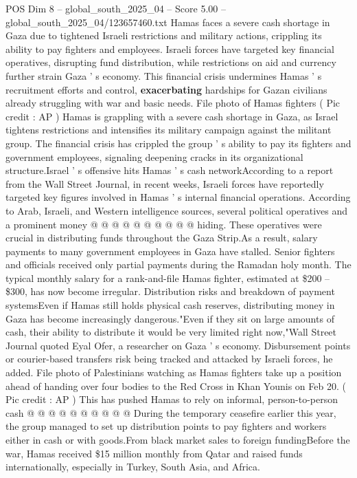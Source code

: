 \begin{textsample}{POS Dim 8 – global\_south\_2025\_04 – Score 5.00 – global\_south\_2025\_04/123657460.txt}  \label{ex:f8_pos_163}
Hamas faces a severe cash shortage in Gaza due to tightened Israeli restrictions and military actions, crippling its ability to pay fighters and employees.
Israeli forces have targeted key financial operatives, disrupting fund distribution, while restrictions on aid and currency further strain Gaza ' s economy.
This financial crisis undermines Hamas ' s recruitment efforts and control, \textbf{exacerbating} hardships for Gazan civilians already struggling with war and basic needs.
File photo of Hamas fighters ( Pic credit : AP ) Hamas is grappling with a severe cash shortage in Gaza, as Israel tightens restrictions and intensifies its military campaign against the militant group.
The financial crisis has crippled the group ' s ability to pay its fighters and government employees, signaling deepening cracks in its organizational structure.Israel ' s offensive hits Hamas ' s cash networkAccording to a report from the Wall Street Journal, in recent weeks, Israeli forces have reportedly targeted key figures involved in Hamas ' s internal financial operations.
According to Arab, Israeli, and Western intelligence sources, several political operatives and a prominent money @ @ @ @ @ @ @ @ @ @ hiding.
These operatives were crucial in distributing funds throughout the Gaza Strip.As a result, salary payments to many government employees in Gaza have stalled.
Senior fighters and officials received only partial payments during the Ramadan holy month.
The typical monthly salary for a rank-and-file Hamas fighter, estimated at \$200 -- \$300, has now become irregular.
Distribution risks and breakdown of payment systemsEven if Hamas still holds physical cash reserves, distributing money in Gaza has become increasingly dangerous."Even if they sit on large amounts of cash, their ability to distribute it would be very limited right now,"Wall Street Journal quoted Eyal Ofer, a researcher on Gaza ' s economy.
Disbursement points or courier-based transfers risk being tracked and attacked by Israeli forces, he added.
File photo of Palestinians watching as Hamas fighters take up a position ahead of handing over four bodies to the Red Cross in Khan Younis on Feb 20. ( Pic credit : AP ) This has pushed Hamas to rely on informal, person-to-person cash @ @ @ @ @ @ @ @ @ @ During the temporary ceasefire earlier this year, the group managed to set up distribution points to pay fighters and workers either in cash or with goods.From black market sales to foreign fundingBefore the war, Hamas received \$15 million monthly from Qatar and raised funds internationally, especially in Turkey, South Asia, and Africa.

\end{textsample}
